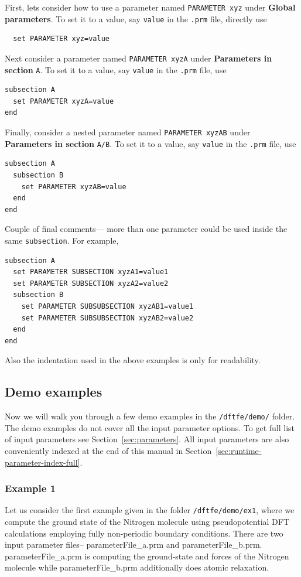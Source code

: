 First, lets consider how to use a parameter named \verb|PARAMETER xyz| under {\bf Global parameters}. To set it to a value, say \verb|value|  in the  \verb|.prm| file, directly use
\begin{verbatim}
  set PARAMETER xyz=value
\end{verbatim}
Next consider a parameter named \verb|PARAMETER xyzA| under {\bf Parameters in section} \verb|A|. To set it to a value, say \verb|value|  in the  \verb|.prm| file, use 
\begin{verbatim}
subsection A
  set PARAMETER xyzA=value
end
\end{verbatim}
Finally, consider a nested parameter named  \verb|PARAMETER xyzAB| under {\bf Parameters in section} \verb|A/B|. To set it to a value, say \verb|value|  in the  \verb|.prm| file, use 
\begin{verbatim}
subsection A
  subsection B
    set PARAMETER xyzAB=value
  end
end
\end{verbatim}
Couple of final comments--- more than one parameter could be used inside the same \verb|subsection|. For example,
\begin{verbatim}
subsection A
  set PARAMETER SUBSECTION xyzA1=value1
  set PARAMETER SUBSECTION xyzA2=value2
  subsection B
    set PARAMETER SUBSUBSECTION xyzAB1=value1
    set PARAMETER SUBSUBSECTION xyzAB2=value2
  end
end
\end{verbatim}
Also the indentation used in the above examples is only for readability.
\subsection{Demo examples}
Now we will walk you through a few demo examples in the \verb|/dftfe/demo/| folder. The demo examples do not cover all the input parameter options. To get full list of input parameters see Section~\ref{sec:parameters}. All input parameters are also conveniently indexed at the end of this manual in Section~\ref{sec:runtime-parameter-index-full}. 
\subsubsection{Example 1}\label{sec:example1}
Let us consider the first example given in the folder
\verb|/dftfe/demo/ex1|, where we compute the ground state of the Nitrogen molecule using pseudopotential DFT calculations employing fully non-periodic boundary conditions.
There are two input parameter files-- parameterFile\_a.prm and parameterFile\_b.prm. parameterFile\_a.prm is
computing the ground-state and forces of the Nitrogen molecule while parameterFile\_b.prm additionally does atomic relaxation.

